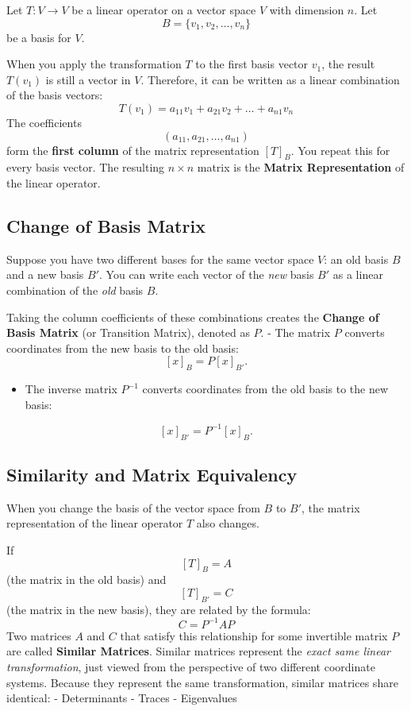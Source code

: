 \documentclass[
]{article}
\providecommand{\tightlist}{%
  \setlength{\itemsep}{0pt}\setlength{\parskip}{0pt}}
\begin{document}
Let \(T: V \to V\) be a linear operator on a vector space \(V\) with
dimension \(n\). Let
\[
B = \lbrace v_1, v_2, \dots, v_n\rbrace
\]
be a basis for \(V\).

When you apply the transformation \(T\) to the first basis vector
\(v_1\), the result \(T(v_1)\) is still a vector in \(V\). Therefore, it
can be written as a linear combination of the basis vectors:
\[
T(v_1) = a_{11}v_1 + a_{21}v_2 + \dots + a_{n1}v_n
\]
The coefficients
\[
(a_{11}, a_{21}, \dots, a_{n1})
\]
form the \textbf{first column} of the matrix representation \([T]_B\).
You repeat this for every basis vector. The resulting \(n \times n\)
matrix is the \textbf{Matrix Representation} of the linear operator.

\subsection{Change of Basis Matrix}\label{change-of-basis-matrix}

Suppose you have two different bases for the same vector space \(V\): an
old basis \(B\) and a new basis \(B'\). You can write each vector of the
\emph{new} basis \(B'\) as a linear combination of the \emph{old} basis
\(B\).

Taking the column coefficients of these combinations creates the
\textbf{Change of Basis Matrix} (or Transition Matrix), denoted as
\(P\). - The matrix \(P\) converts coordinates from the new basis to the
old basis:
\[
[x]_B = P[x]_{B'}.
\]
\begin{itemize}
\tightlist
\item
  The inverse matrix \(P^{-1}\) converts coordinates from the old basis
  to the new basis:
\end{itemize}
\[
[x]_{B'} = P^{-1}[x]_B.
\]

\subsection{Similarity and Matrix
Equivalency}\label{similarity-and-matrix-equivalency}

When you change the basis of the vector space from \(B\) to \(B'\), the
matrix representation of the linear operator \(T\) also changes.

If
\[
[T]_B = A
\]
(the matrix in the old basis) and
\[
[T]_{B'} = C
\]
(the matrix in the new basis), they are related by the formula:
\[
C = P^{-1} A P
\]
Two matrices \(A\) and \(C\) that satisfy this relationship for some
invertible matrix \(P\) are called \textbf{Similar Matrices}. Similar
matrices represent the \emph{exact same linear transformation}, just
viewed from the perspective of two different coordinate systems. Because
they represent the same transformation, similar matrices share
identical: - Determinants - Traces - Eigenvalues
\end{document}
